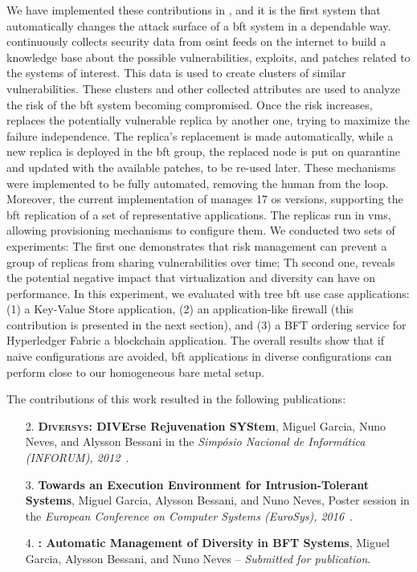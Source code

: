 We have implemented these contributions in \system, and it is the first system that automatically changes the attack surface of a \gls{bft} system in a dependable way.
\system continuously collects security data from \gls{osint} feeds on the internet to build a knowledge base about the possible vulnerabilities, exploits, and patches related to the systems of interest.
This data is used to create clusters of similar vulnerabilities.
These clusters and other collected attributes are used to analyze the risk of the \gls{bft} system becoming compromised. 
Once the risk increases, \system replaces the potentially vulnerable replica by another one, trying to maximize the failure independence. 
The replica's replacement is made automatically, while a new replica is deployed in the \gls{bft} group, the replaced node is put on quarantine and updated with the available patches, to be re-used later.
These mechanisms were implemented to be fully automated, removing the human from the loop.
Moreover, the current implementation of \system manages 17 \gls{os} versions, supporting the \gls{bft} replication of a set of representative applications.
The replicas run in \glspl{vm}, allowing provisioning mechanisms to configure them. 
We conducted two sets of experiments: The first one demonstrates that \system risk management can prevent a group of replicas from sharing vulnerabilities over time; 
Th second one, reveals the potential negative impact that virtualization and diversity can have on performance. 
In this experiment, we evaluated \system with tree \gls{bft} use case applications: (1) a Key-Value Store application, (2) \sieveq an application-like firewall (this contribution is presented in the next section), and (3) a BFT ordering service for Hyperledger Fabric a blockchain application.
The overall results show that if naive configurations are avoided, \gls{bft} applications in diverse configurations can perform close to our homogeneous bare metal setup.

The contributions of this work resulted in the following publications:

\begin{enumerate}

\item[2.] \textbf{\textsc{Diversys}: DIVErse Rejuvenation SYStem}, Miguel Garcia, Nuno Neves, and  Alysson Bessani in the \emph{Simp\'{o}sio Nacional de Inform\'{a}tica (INFORUM), 2012~\cite{Garcia:2012b}}.


\item[3.] \textbf{Towards an Execution Environment for Intrusion-Tolerant Systems}, Miguel Garcia, Alysson Bessani, and Nuno Neves, Poster session in the \emph{European Conference on Computer Systems (EuroSys), 2016}~\cite{Garcia:2016b}.


\item[4.] \textbf{\system: Automatic Management of Diversity in BFT Systems}, Miguel Garcia, Alysson Bessani, and Nuno Neves -- \emph{Submitted for publication}.

\end{enumerate}


